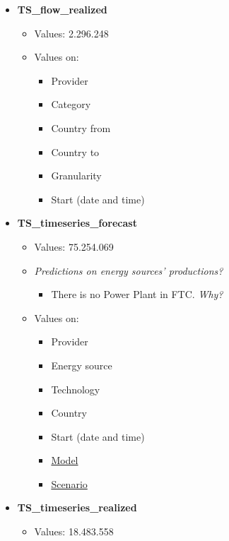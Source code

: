 \begin{itemize}
        \item \textbf{TS\_flow\_realized}
        \begin{itemize}
            \item Values: 2.296.248
            
            \item Values on:
            \begin{itemize}
                \item Provider
                \item Category
                \item Country from
                \item Country to
                \item Granularity
                \item Start (date and time)
            \end{itemize}
        \end{itemize}
        
        \item \textbf{TS\_timeseries\_forecast}
        \begin{itemize}
            \item Values: 75.254.069
            
            \item \textit{Predictions on energy sources' productions?}
            \begin{itemize}
                \item There is no Power Plant in FTC. \textit{Why?}
            \end{itemize}
            
            \item Values on:
            \begin{itemize}
                \item Provider
                \item Energy source
                \item Technology
                \item Country
                \item Start (date and time)
                \item \underline{Model}
                \item \underline{Scenario}
            \end{itemize}
        \end{itemize}
        
        \item \textbf{TS\_timeseries\_realized}
        \begin{itemize}
            \item Values: 18.483.558
            

\end{itemize}
\end{itemize}
